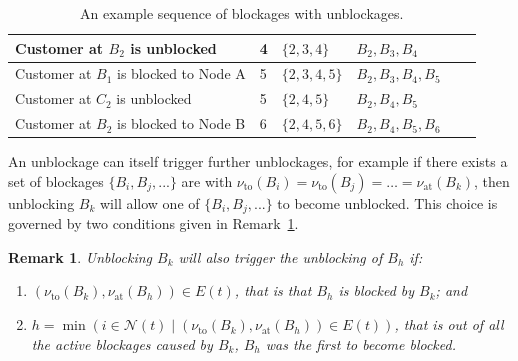 \documentclass{article}
\newtheorem{remark}{Remark}
\begin{document}
\begin{table}
\begin{center}
\begin{tabular}{m{} m{} m{} m{} m{} m{}}
Customer at $B_2$ is unblocked         & 4 & $\{2, 3, 4\}$    & $B_2, B_3, B_4$      & \vspace{1mm} & \vspace{1mm} \\ \midrule
Customer at $B_1$ is blocked to Node A & 5 & $\{2, 3, 4, 5\}$ & $B_2, B_3, B_4, B_5$ & \vspace{1mm} & \vspace{1mm} \\ \midrule
Customer at $C_2$ is unblocked         & 5 & $\{2, 4, 5\}$    & $B_2, B_4, B_5$      & \vspace{1mm} & \vspace{1mm} \\ \midrule
Customer at $B_2$ is blocked to Node B & 6 & $\{2, 4, 5, 6\}$ & $B_2, B_4, B_5, B_6$ & \vspace{1mm} & \vspace{1mm} \\
\bottomrule
\end{tabular}
\caption{An example sequence of blockages with unblockages.}
\label{tbl:blockage_sequence}
\end{center}
\end{table}

An unblockage can itself trigger further unblockages, for example if there
exists a set of blockages $\{B_i, B_j, ...\}$ are with
$\nu_{\text{to}}(B_i) = \nu_{\text{to}}(B_j) = \dots = \nu_{\text{at}}(B_k)$,
then unblocking $B_k$ will allow one of $\{B_i, B_j, ...\}$ to become unblocked.
This choice is governed by two conditions given in
Remark~\ref{rmk:unblocking_sequence}.

\begin{remark}\label{rmk:unblocking_sequence}
Unblocking $B_k$ will also trigger the unblocking of $B_h$ if:
\begin{enumerate}
  \item \label{pnt:necessity}
  $(\nu_{\text{to}}(B_k), \nu_{\text{at}}(B_h)) \in E(t)$, that is that $B_h$ is
  blocked by $B_k$; and
  \item \label{pnt:choice}
  $h = \min(i \in \mathcal{N}(t) \; | \; (\nu_{\text{to}}(B_k), \nu_{\text{at}}(B_h)) \in E(t))$,
  that is out of all the active blockages caused by $B_k$, $B_h$ was the first
  to become blocked.
\end{enumerate}
\end{remark}
\end{document}
